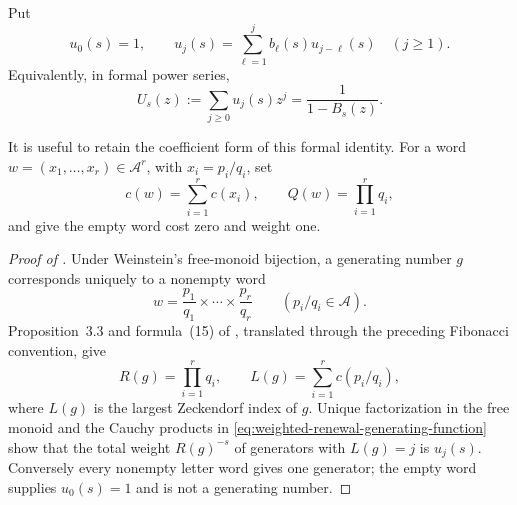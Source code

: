 Put
\begin{equation}
 u_0(s)=1,
 \qquad
 u_j(s)=\sum_{\ell=1}^jb_\ell(s)u_{j-\ell}(s)\quad(j\ge1).
 \label{eq:weighted-renewal-coefficients}
\end{equation}
Equivalently, in formal power series,
\begin{equation}
 U_s(z):=\sum_{j\ge0}u_j(s)z^j=\frac1{1-B_s(z)}.
 \label{eq:weighted-renewal-generating-function}
\end{equation}

It is useful to retain the coefficient form of this formal identity.  For a
word \(w=(x_1,\ldots,x_r)\in\mathcal A^r\), with
\(x_i=p_i/q_i\), set
\[
 c(w)=\sum_{i=1}^r c(x_i),\qquad
 Q(w)=\prod_{i=1}^r q_i,
\]
and give the empty word cost zero and weight one.

\begin{proof}[Proof of ]
Under Weinstein's free-monoid bijection, a generating number \(g\)
corresponds uniquely to a nonempty word
\[
 w=\frac{p_1}{q_1}\times\cdots\times\frac{p_r}{q_r}
 \qquad(p_i/q_i\in\mathcal A).
\]
  Proposition~3.3 and formula~(15) of
\cite{Weinstein2016}, translated through the preceding Fibonacci convention,
give
\begin{equation}
 R(g)=\prod_{i=1}^rq_i,
 \qquad
 L(g)=\sum_{i=1}^rc(p_i/q_i),
 \label{eq:generator-weight-cost}
\end{equation}
where \(L(g)\) is the largest Zeckendorf index of \(g\).  Unique
factorization in the free monoid and the Cauchy products in
\eqref{eq:weighted-renewal-generating-function} show that the total weight
\(R(g)^{-s}\) of generators with \(L(g)=j\) is \(u_j(s)\).  Conversely
every nonempty letter word gives one generator; the empty word supplies
\(u_0(s)=1\) and is not a generating number.


\end{proof}
